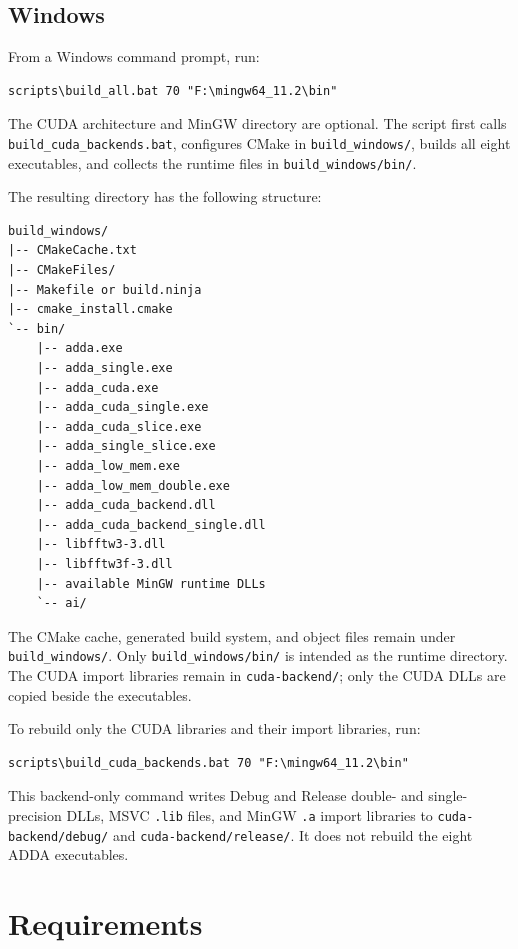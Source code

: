 \documentclass[11pt,a4paper]{article}
\newcommand{\code}[1]{\nolinkurl{#1}}
\begin{document}
\subsection{Windows}

From a Windows command prompt, run:

\begin{lstlisting}
scripts\build_all.bat 70 "F:\mingw64_11.2\bin"
\end{lstlisting}

The CUDA architecture and MinGW directory are optional. The script first calls
\code{build_cuda_backends.bat}, configures CMake in \code{build_windows/},
builds all eight executables, and collects the runtime files in
\code{build_windows/bin/}.

The resulting directory has the following structure:

\begin{lstlisting}
build_windows/
|-- CMakeCache.txt
|-- CMakeFiles/
|-- Makefile or build.ninja
|-- cmake_install.cmake
`-- bin/
    |-- adda.exe
    |-- adda_single.exe
    |-- adda_cuda.exe
    |-- adda_cuda_single.exe
    |-- adda_cuda_slice.exe
    |-- adda_single_slice.exe
    |-- adda_low_mem.exe
    |-- adda_low_mem_double.exe
    |-- adda_cuda_backend.dll
    |-- adda_cuda_backend_single.dll
    |-- libfftw3-3.dll
    |-- libfftw3f-3.dll
    |-- available MinGW runtime DLLs
    `-- ai/
\end{lstlisting}

The CMake cache, generated build system, and object files remain under
\code{build_windows/}. Only \code{build_windows/bin/} is intended as the
runtime directory. The CUDA import libraries remain in \code{cuda-backend/};
only the CUDA DLLs are copied beside the executables.

To rebuild only the CUDA libraries and their import libraries, run:

\begin{lstlisting}
scripts\build_cuda_backends.bat 70 "F:\mingw64_11.2\bin"
\end{lstlisting}

This backend-only command writes Debug and Release double- and
single-precision DLLs, MSVC \code{.lib} files, and MinGW \code{.a} import
libraries to \code{cuda-backend/debug/} and \code{cuda-backend/release/}. It
does not rebuild the eight ADDA executables.

\section{Requirements}
\end{document}

